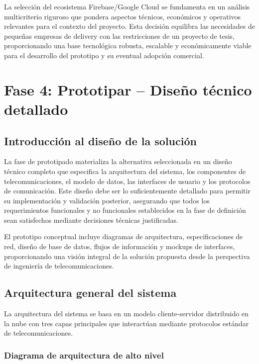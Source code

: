 La selección del ecosistema Firebase/Google Cloud se fundamenta en un análisis multicriterio riguroso que pondera aspectos técnicos, económicos y operativos relevantes para el contexto del proyecto. Esta decisión equilibra las necesidades de pequeñas empresas de delivery con las restricciones de un proyecto de tesis, proporcionando una base tecnológica robusta, escalable y económicamente viable para el desarrollo del prototipo y su eventual adopción comercial.

\section{Fase 4: Prototipar – Diseño técnico detallado}

\subsection{Introducción al diseño de la solución}

La fase de prototipado materializa la alternativa seleccionada en un diseño técnico completo que especifica la arquitectura del sistema, los componentes de telecomunicaciones, el modelo de datos, las interfaces de usuario y los protocolos de comunicación. Este diseño debe ser lo suficientemente detallado para permitir su implementación y validación posterior, asegurando que todos los requerimientos funcionales y no funcionales establecidos en la fase de definición sean satisfechos mediante decisiones técnicas justificadas.

El prototipo conceptual incluye diagramas de arquitectura, especificaciones de red, diseño de base de datos, flujos de información y mockups de interfaces, proporcionando una visión integral de la solución propuesta desde la perspectiva de ingeniería de telecomunicaciones.

\subsection{Arquitectura general del sistema}

La arquitectura del sistema se basa en un modelo cliente-servidor distribuido en la nube con tres capas principales que interactúan mediante protocolos estándar de telecomunicaciones.

\subsubsection{Diagrama de arquitectura de alto nivel}

